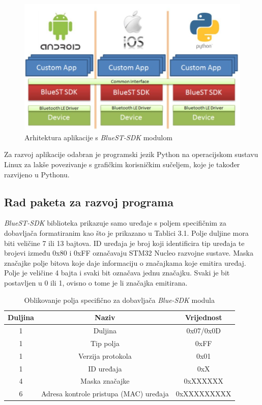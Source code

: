 \begin{figure}[ht]
	\includegraphics[width=\linewidth]{imgs/bluest_stack}
	\caption{Arhitektura aplikacije s \textit{BlueST-SDK} modulom}
	\label{fig:bluest_stack}
\end{figure}


Za razvoj aplikacije odabran je programski jezik Python na operacijskom sustavu Linux za lakše povezivanje s grafičkim korisničkim sučeljem, koje je također razvijeno u Pythonu. 

\subsection{Rad paketa za razvoj programa}

\textit{BlueST-SDK} biblioteka prikazuje samo uređaje s poljem specifičnim za dobavljača formatiranim kao što je prikazano u Tablici 3.1. Polje duljine mora biti veličine 7 ili 13 bajtova. ID uređaja je broj koji identificira tip uređaja te brojevi između 0x80 i 0xFF označavaju STM32 Nucleo razvojne sustave. Maska značajke polje bitova koje daje informaciju o značajkama koje emitira uređaj. Polje je veličine 4 bajta i svaki bit označava jednu značajku. Svaki je bit postavljen u 0 ili 1, ovisno o tome je li značajka emitirana. 

\begin{table}[ht!]
	\centering
	\caption{Oblikovanje polja specifično za dobavljača \textit{Blue-SDK} modula}
	\begin{tabular}{|c| c| c|}
		\hline
		\rowcolor{lightblue}  
		\textbf{Duljina} & \textbf{Naziv} & \textbf{Vrijednost} \\ \hline
		1 & Duljina & 0x07/0x0D \\ \hline
		1 & Tip polja & 0xFF \\ \hline
		1 & Verzija protokola & 0x01 \\ \hline
		1 & ID uređaja & 0xX \\ \hline
		4 & Maska značajke & 0xXXXXXX \\ \hline
		6 & Adresa kontrole pristupa (MAC) uređaja & 0xXXXXXXXXX \\ \hline
	\end{tabular}
\end{table}

